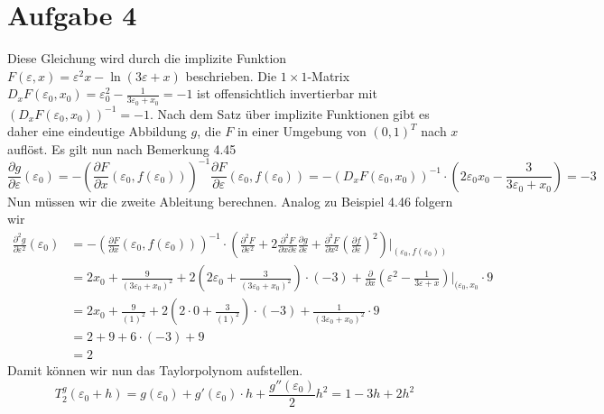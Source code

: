 \documentclass{article}
\theoremstyle{definition}
\renewcommand{\epsilon}{\varepsilon}
\newcommand{\pdv}[2]{\frac{\partial #1}{\partial #2}}
\begin{document}
\section*{Aufgabe 4}
Diese Gleichung wird durch die implizite Funktion $F(\epsilon,x) = \epsilon^2x - \ln(3\epsilon + x)$ beschrieben. Die $1\times 1$-Matrix $D_xF(\epsilon_0,x_0) = \epsilon_0^2 - \frac{1}{3\epsilon_0 + x_0} = -1$ ist offensichtlich invertierbar mit $(D_xF(\epsilon_0,x_0))^{-1} = -1$. Nach dem Satz über implizite Funktionen gibt es daher eine eindeutige Abbildung $g$, die $F$ in einer Umgebung von $(0,1)^T$ nach $x$ auflöst. Es gilt nun nach Bemerkung 4.45
\[
	\pdv{g}{\epsilon}(\epsilon_0) = -\left(\pdv{F}{x}(\epsilon_0,f(\epsilon_0))\right)^{-1} \pdv{F}{\epsilon}(\epsilon_0,f(\epsilon_0)) = -(D_xF(\epsilon_0,x_0))^{-1} \cdot \left(2\epsilon_0x_0 - \frac{3}{3\epsilon_0 + x_0}\right) = -3
\]
Nun müssen wir die zweite Ableitung berechnen. Analog zu Beispiel 4.46 folgern wir
\begin{align*}
	\pdv{^2g}{\epsilon^2}(\epsilon_0) &= -\left(\pdv{F}{x}(\epsilon_0,f(\epsilon_0))\right)^{-1} \cdot \left(\pdv{^2F}{\epsilon^2} + 2\pdv{^2 F}{x\partial \epsilon}\pdv{g}{\epsilon} + \pdv{^2F}{x^2}\left(\pdv{f}{\epsilon}\right)^2\right)\bigg|_{(\epsilon_0,f(\epsilon_0))}\\
	&= 2x_0 + \frac{9}{(3\epsilon_0 + x_0)^2} + 2\left(2 \epsilon_0 + \frac{3}{(3\epsilon_0 + x_0)^2}\right)\cdot (-3) + \pdv{}{x}\left(\epsilon^2 - \frac{1}{3\epsilon + x}\right)\bigg|_{(\epsilon_0,x_0}\cdot 9\\
	&= 2x_0 + \frac{9}{(1)^2} + 2\left(2 \cdot 0 + \frac{3}{(1)^2}\right)\cdot (-3) + \frac{1}{(3\epsilon_0 + x_0)^2}\cdot 9\\
	&= 2 + 9 + 6\cdot (-3) + 9\\
	&= 2
\end{align*}
Damit können wir nun das Taylorpolynom aufstellen.
\[
	T_2^g(\epsilon_0 + h) = g(\epsilon_0) + g'(\epsilon_0)\cdot h + \frac{g''(\epsilon_0)}{2}h^2 = 1 -3 h + 2h^2
\]
\end{document}
